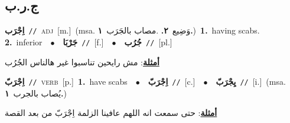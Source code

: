 \documentclass[10pt,a4paper,twoside]{article} %
\begin{document}
\begin{multicols}{2}
\vspace{-3mm}
\subsection*{\color{blue}\foreignlanguage{arabic}{ج.ر.ب}\color{blue}{}} 

{\setlength\topsep{0pt}\textbf{\foreignlanguage{arabic}{اِجْرَب}}\ {\color{gray}\texttt{//}\color{black}}\ \textsc{adj}\ [m.]\ \color{gray}(msa. \foreignlanguage{arabic}{وَضِيع}~\foreignlanguage{arabic}{\textbf{٢.}}  .\foreignlanguage{arabic}{مصاب بالجَرَب}~\foreignlanguage{arabic}{\textbf{١.}})\color{black}\ \textbf{1.}~having scabs.  \textbf{2.}~inferior\ \ $\bullet$\ \ \setlength\topsep{0pt}\textbf{\foreignlanguage{arabic}{جَرْبَا}}\ {\color{gray}\texttt{//}\color{black}}\ [f.]\ \ $\bullet$\ \ \setlength\topsep{0pt}\textbf{\foreignlanguage{arabic}{جُرُب}}\ {\color{gray}\texttt{//}\color{black}}\ [pl.]\  \begin{flushright}\color{gray}\foreignlanguage{arabic}{\textbf{\underline{\foreignlanguage{arabic}{أمثلة}}}: مش رايحين تناسبوا غير هالناس الجُرُب}\end{flushright}\color{black}} \vspace{2mm}

{\setlength\topsep{0pt}\textbf{\foreignlanguage{arabic}{اِجْرَبّ}}\ {\color{gray}\texttt{//}\color{black}}\ \textsc{verb}\ [p.]\ \textbf{1.}~have scabs\ \ $\bullet$\ \ \setlength\topsep{0pt}\textbf{\foreignlanguage{arabic}{اِجْرَبّ}}\ {\color{gray}\texttt{//}\color{black}}\ [c.]\ \ $\bullet$\ \ \setlength\topsep{0pt}\textbf{\foreignlanguage{arabic}{يِجْرَبّ}}\ {\color{gray}\texttt{//}\color{black}}\ [i.]\ \color{gray}(msa. \foreignlanguage{arabic}{يُصاب بالجرب}~\foreignlanguage{arabic}{\textbf{١.}})\color{black}\  \begin{flushright}\color{gray}\foreignlanguage{arabic}{\textbf{\underline{\foreignlanguage{arabic}{أمثلة}}}: حتى سمعت انه اللهم عافينا الزلمة اِجْرَبّ من بعد القصة}\end{flushright}\color{black}} \vspace{2mm}


\end{multicols}
\end{document}
